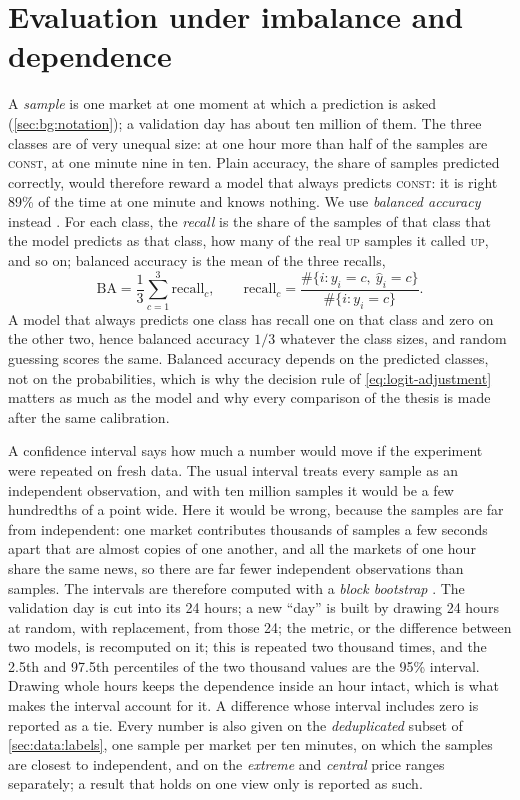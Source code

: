 \section{Evaluation under imbalance and dependence}
\label{sec:bg:eval}

A \emph{sample} is one market at one moment at which a prediction is asked
(\cref{sec:bg:notation}); a validation day has about ten million of them.  The three
classes are of very unequal size: at one hour more than half of the samples are
\textsc{const}, at one minute nine in ten.  Plain accuracy, the share of samples predicted
correctly, would therefore reward a model that always predicts \textsc{const}: it is right
89\% of the time at one minute and knows nothing.  We use \emph{balanced
accuracy} instead \cite{brodersen2010balanced}.  For each class, the \emph{recall} is the
share of the samples of that class that the model predicts as that class, how many of
the real \textsc{up} samples it called \textsc{up}, and so on; balanced accuracy is the
mean of the three recalls,
\begin{equation}
  \mathrm{BA} = \frac{1}{3} \sum_{c=1}^{3} \mathrm{recall}_c, \qquad
  \mathrm{recall}_c = \frac{\#\{i : y_i = c,\ \hat{y}_i = c\}}{\#\{i : y_i = c\}} .
\end{equation}
A model that always predicts one class has recall one on that class and zero on the other
two, hence balanced accuracy $1/3$ whatever the class sizes, and random guessing scores
the same.  Balanced accuracy depends on the predicted classes, not on the probabilities,
which is why the decision rule of \cref{eq:logit-adjustment} matters as much as the model
and why every comparison of the thesis is made after the same calibration.

A confidence interval says how much a number would move if the experiment were repeated
on fresh data.  The usual interval treats every sample as an independent observation, and
with ten million samples it would be a few hundredths of a point wide.  Here it would be
wrong, because the samples are far from independent: one market contributes thousands of
samples a few seconds apart that are almost copies of one another, and all the markets of
one hour share the same news, so there are far fewer independent observations than
samples.  The intervals are therefore computed with a \emph{block bootstrap}
\cite{kunsch1989jackknife}.  The validation day is cut into its 24 hours; a new ``day''
is built by drawing 24 hours at random, with replacement, from those 24; the metric, or
the difference between two models, is recomputed on it; this is repeated two thousand
times, and the 2.5th and 97.5th percentiles of the two thousand values are the 95\%
interval.  Drawing whole hours keeps the dependence inside an hour intact, which is what
makes the interval account for it.  A difference whose interval includes zero is reported
as a tie.  Every number is also given on the \emph{deduplicated} subset of
\cref{sec:data:labels}, one sample per market per ten minutes, on which the samples
are closest to independent, and on the \emph{extreme} and \emph{central} price ranges
separately; a result that holds on one view only is reported as such.

